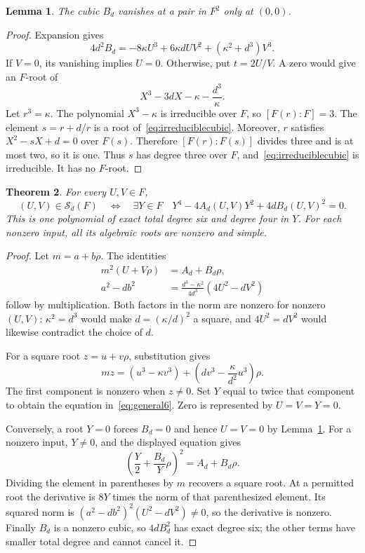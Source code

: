\documentclass[11pt,a4paper]{article}
\newtheorem{theorem}{Theorem}[section]
\newtheorem{lemma}[theorem]{Lemma}
\begin{document}
\begin{lemma}\label{lem:generalB}
The cubic $B_d$ vanishes at a pair in $F^2$ only at $(0,0)$.
\end{lemma}
\begin{proof}
Expansion gives
\[
 4d^2B_d=-8\kappa U^3+6\kappa dUV^2+(\kappa^2+d^3)V^3.
\]
If $V=0$, its vanishing implies $U=0$. Otherwise, put $t=2U/V$.
A zero would give an $F$-root of
\begin{equation}\label{eq:irreduciblecubic}
             X^3-3dX-\kappa-\frac{d^3}{\kappa}.
\end{equation}
Let $r^3=\kappa$. The polynomial $X^3-\kappa$ is irreducible over $F$,
so $[F(r):F]=3$. The element $s=r+d/r$ is a root
of~\eqref{eq:irreduciblecubic}. Moreover, $r$ satisfies
$X^2-sX+d=0$ over $F(s)$. Therefore $[F(r):F(s)]$ divides three
and is at most two, so it is one. Thus $s$ has degree three over $F$,
and~\eqref{eq:irreduciblecubic} is irreducible. It has no $F$-root.
\end{proof}

\begin{theorem}\label{thm:general}
For every $U,V\in F$,
\begin{equation}\label{eq:general6}
 (U,V)\in\mathcal S_d(F)
 \quad\Longleftrightarrow\quad
 \exists Y\in F\quad
 Y^4-4A_d(U,V)Y^2+4dB_d(U,V)^2=0.
\end{equation}
This is one polynomial of exact total degree six and degree four in $Y$.
For each nonzero input, all its algebraic roots are nonzero and simple.
\end{theorem}
\begin{proof}
Let $m=a+b\rho$. The identities
\begin{align*}
 m^2(U+V\rho)&=A_d+B_d\rho,\\
 a^2-db^2&=\frac{d^3-\kappa^2}{4d^3}(4U^2-dV^2)
\end{align*}
follow by multiplication. Both factors in the norm are nonzero for
nonzero $(U,V)$: $\kappa^2=d^3$ would make $d=(\kappa/d)^2$ a
square, and $4U^2=dV^2$ would likewise contradict the choice of $d$.

For a square root $z=u+v\rho$, substitution gives
\[
 mz=(u^3-\kappa v^3)
           +\left(dv^3-\frac{\kappa}{d^2}u^3\right)\rho.
\]
The first component is nonzero when $z\ne0$. Set $Y$ equal to twice
that component to obtain the equation in~\eqref{eq:general6}.
Zero is represented by $U=V=Y=0$.

Conversely, a root $Y=0$ forces $B_d=0$ and hence $U=V=0$ by
Lemma~\ref{lem:generalB}. For a nonzero input, $Y\ne0$, and the
displayed equation gives
\[
       \left(\frac Y2+\frac{B_d}{Y}\rho\right)^2=A_d+B_d\rho.
\]
Dividing the element in parentheses by $m$ recovers a square root.
At a permitted root the derivative is $8Y$ times the norm of that
parenthesized element. Its squared norm is
$(a^2-db^2)^2(U^2-dV^2)\ne0$, so the derivative is nonzero.
Finally $B_d$ is a nonzero cubic, so $4dB_d^2$ has exact degree six;
the other terms have smaller total degree and cannot cancel it.
\end{proof}
\end{document}
